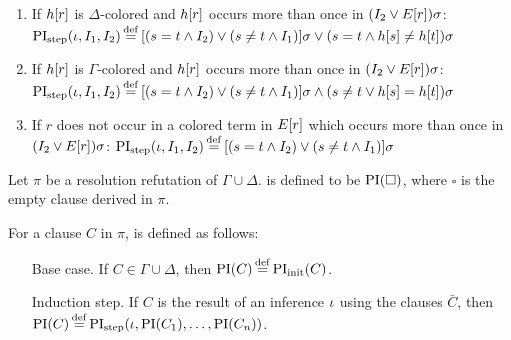 \begin{defi}[$\PIstep$]
\begin{itemize}
			\begin{enumerate}
				\item If $h[r]$ is $\Delta$-colored and $h[r]$ occurs more than once in $(I_2 \lor E[r])\sigma$:
					\label{def:PI_paramod_1}
					\newline
					$\PIstep(\inference, I_1, I_2) \defeq{} [ ( s=t \land I_2 ) \lor (s\neq t \land I_1) ]\sigma \lor (s=t \land h\occur{s} \neq      h\occur{t})\sigma$
				\item If $h[r]$ is $\Gamma$-colored and $h[r]$ occurs more than once in $(I_2 \lor E[r])\sigma$:
					\label{def:PI_paramod_2}
					\newline
					$\PIstep(\inference, I_1, I_2) \defeq{} [ ( s=t \land I_2 ) \lor (s\neq t \land I_1) ]\sigma \land (s\neq t \lor h\occur{s} =     h\occur{t})\sigma$
				\item If $r$ does not occur in a colored term in $E[r]$ which occurs more than once in\nolinebreak{} $(I_2 \lor E[r])\sigma$:
					\label{def:PI_paramod_3}
					\newline
					$\PIstep(\inference, I_1, I_2) \defeq{} [ ( s=t \land I_2 ) \lor (s\neq t \land I_1) ]\sigma$ \qedhere

			\end{enumerate}

	\end{itemize}


\end{defi}



\begin{defi}
	\label{def:PI}
	Let $\pi$ be a resolution refutation of $\Gamma \cup \Delta$.
	 is defined to be $\operatorname{PI}(\square)$, where $\square$ is the empty clause derived in $\pi$.

	For a clause $C$ in $\pi$,  is defined as follows:
	\begin{itemize}
		\item[Base case.]
			If $C \in \Gamma\cup\Delta$, then $\PI(C) \defeq \PIinit(C)$.
		\item[Induction step.]
			If $C$ is the result of an inference $\iota$ using the clauses $\bar C$, then $\PI(C) \defeq \PIstep(\inference, \PI(C_1), \dots, \PI(C_n))$.


	\end{itemize}
\end{defi}


